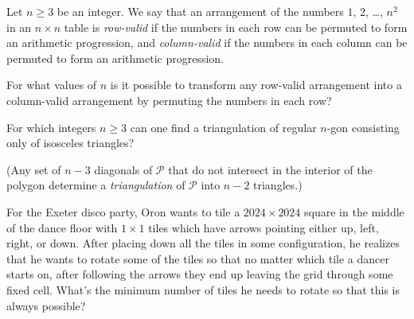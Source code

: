 
\begin{problem}
Let $n\geq3$ be an integer. We say that an arrangement of the numbers
$1$, $2$, \dots, $n^2$ in an $n \times n$ table is \emph{row-valid}
if the numbers in each row can be permuted to form an arithmetic progression,
and \emph{column-valid} if the numbers in each column
can be permuted to form an arithmetic progression.

For what values of $n$ is it possible to transform any row-valid arrangement
into a column-valid arrangement by permuting the numbers in each row?
\end{problem} 



\begin{reqproblem}
	For which integers $n \ge 3$ can one find a triangulation
	of regular $n$-gon consisting only of isosceles triangles?
\end{reqproblem} 



(Any set of $n - 3$ diagonals of $\mathcal{P}$ that
do not intersect in the interior of the polygon
determine a \textit{triangulation} of $\mathcal{P}$ into $n - 2$ triangles.)

\begin{problem}
For the Exeter disco party,
Oron wants to tile a $2024 \times 2024$ square in the middle of the dance floor
with $1 \times 1$ tiles which have arrows pointing either up, left, right, or down.
After placing down all the tiles in some configuration,
he realizes that he wants to rotate some of the tiles so that
no matter which tile a dancer starts on,
after following the arrows they end up leaving the grid through some fixed cell.
What's the minimum number of tiles he needs to rotate so that this is always possible?
\end{problem} 




